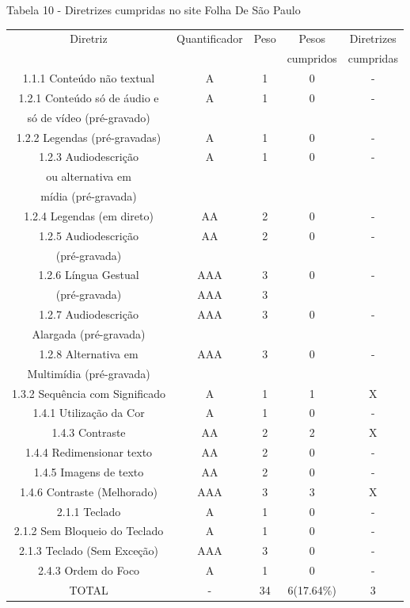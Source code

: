 \documentclass[a4paper]{article}
\begin{document}
\begin{titlepage}
Tabela 10 - Diretrizes cumpridas no site Folha De São Paulo\\[-1cm]
\begin{center}
	\fontsize{8pt}{8pt}\selectfont	
	\begin{longtable}{|c|c|c|c|c|}
		\hline
		Diretriz & Quantificador & Peso & Pesos & Diretrizes\\
		& & & cumpridos & cumpridas\\
		\hline
		1.1.1 Conteúdo não textual & A & 1 & 0 & - \\
		\hline
		1.2.1 Conteúdo só de áudio e & A & 1 & 0 & - \\
		só de vídeo (pré-gravado) & & & & \\
		\hline
		1.2.2 Legendas (pré-gravadas) & A & 1 & 0 & - \\
		\hline
		1.2.3 Audiodescrição & A & 1 & 0 & - \\
		ou alternativa em & & & & \\
		mídia (pré-gravada) & & & & \\
		\hline
		1.2.4 Legendas (em direto) & AA & 2 & 0 & - \\
		\hline
		1.2.5 Audiodescrição & AA & 2 & 0 & - \\
		(pré-gravada) & & & & \\
		\hline
		1.2.6 Língua Gestual & AAA & 3 & 0 & - \\
		(pré-gravada) & AAA & 3 & & \\
		\hline
		1.2.7 Audiodescrição & AAA & 3 & 0 & - \\
		Alargada (pré-gravada) & & & & \\
		\hline
		1.2.8 Alternativa em & AAA & 3 & 0 & - \\
		Multimídia (pré-gravada) & & & & \\
		\hline
		1.3.2 Sequência com Significado & A & 1 & 1 & X \\
		\hline
		1.4.1 Utilização da Cor & A & 1 & 0 & - \\
		\hline
		1.4.3 Contraste & AA & 2 & 2 & X \\
		\hline
		1.4.4 Redimensionar texto & AA & 2 & 0 & - \\
		\hline
		1.4.5 Imagens de texto & AA & 2 & 0 & - \\
		\hline
		1.4.6 Contraste (Melhorado) & AAA & 3 & 3 & X \\
		\hline
		2.1.1 Teclado & A & 1 & 0 & - \\
		\hline
		2.1.2 Sem Bloqueio do Teclado & A & 1 & 0 & - \\
		\hline
		2.1.3 Teclado (Sem Exceção) & AAA & 3 & 0 & - \\
		\hline
		2.4.3 Ordem do Foco & A & 1 & 0 & - \\
		\hline
		TOTAL & - & 34 & 6(17.64\%) & 3 \\
		\hline
	\end{longtable}
\end{center}


\end{titlepage}
\end{document}
